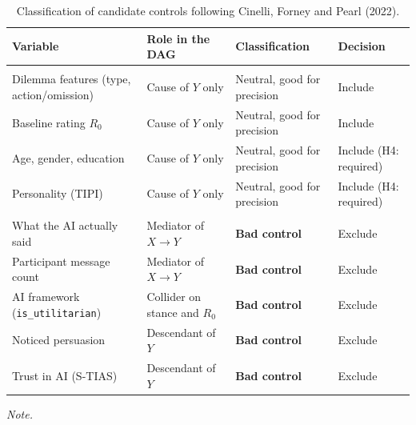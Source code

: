 \begin{table}[!h]
\centering
\caption{\label{tab:controls}Classification of candidate controls following Cinelli, Forney and Pearl (2022).}
\centering
\fontsize{9}{11}\selectfont
\begin{threeparttable}
\begin{tabular}[t]{>{\raggedright\arraybackslash}p{4.0cm}>{\raggedright\arraybackslash}p{3.4cm}>{\raggedright\arraybackslash}p{3.2cm}l}
\toprule
Variable & Role in the DAG & Classification & Decision\\
\midrule
\addlinespace[0.3em]
\multicolumn{4}{l}{\textbf{Pre-exposure}}\\
\hspace{1em}Dilemma features (type, action/omission) & Cause of $Y$ only & Neutral, good for precision & Include\\
\hspace{1em}Baseline rating $R_0$ & Cause of $Y$ only & Neutral, good for precision & Include\\
\hspace{1em}Age, gender, education & Cause of $Y$ only & Neutral, good for precision & Include (H4: required)\\
\hspace{1em}Personality (TIPI) & Cause of $Y$ only & Neutral, good for precision & Include (H4: required)\\
\addlinespace[0.3em]
\multicolumn{4}{l}{\textbf{Post-exposure}}\\
\hspace{1em}What the AI actually said & Mediator of $X \rightarrow Y$ & \textbf{Bad control} & Exclude\\
\hspace{1em}Participant message count & Mediator of $X \rightarrow Y$ & \textbf{Bad control} & Exclude\\
\hspace{1em}AI framework (\texttt{is\_utilitarian}) & Collider on stance and $R_0$ & \textbf{Bad control} & Exclude\\
\hspace{1em}Noticed persuasion & Descendant of $Y$ & \textbf{Bad control} & Exclude\\
\hspace{1em}Trust in AI (S-TIAS) & Descendant of $Y$ & \textbf{Bad control} & Exclude\\
\bottomrule
\end{tabular}
\begin{tablenotes}
\item \textit{Note.} 

\end{tablenotes}
\end{threeparttable}
\end{table}
